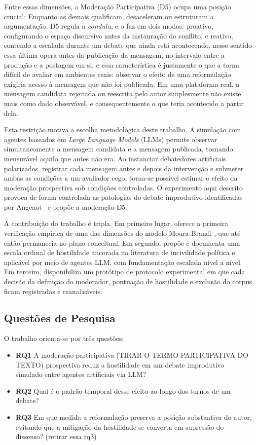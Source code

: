 \documentclass[conference]{IEEEtran} \IEEEoverridecommandlockouts %
\begin{document}
Entre essas dimensões, a Moderação Participativa (D5) ocupa uma posição crucial: Enquanto as demais qualificam, desaceleram ou estruturam a
argumentação, D5 regula a \textit{conduta}, e o faz em dois modos: proativo,
configurando o espaço discursivo antes da instauração do conflito, e reativo,
contendo a escalada durante um debate que ainda está acontecendo, nesse sentido essa última opera antes da publicação da mensagem, no intervalo entre a produção e
a postagem em si, e essa característica é justamente o que a torna difícil de
avaliar em ambientes reais: observar o efeito de uma reformulação exigiria
acesso à mensagem que não foi publicada. Em uma plataforma real, a mensagem
candidata rejeitada ou reescrita pelo autor simplesmente não existe mais como dado
observável, e consequentemente o que teria acontecido a partir dela.

Esta restrição motiva a escolha metodológica deste trabalho. A simulação com
agentes baseados em \textit{Large Language Models} (LLMs) permite observar
simultaneamente a mensagem candidata e a mensagem publicada, tornando
mensurável aquilo que antes não era. Ao instanciar
debatedores artificiais polarizados, registrar cada mensagem antes e depois da
intervenção e submeter ambas as condições a um avaliador cego, torna-se
possível estimar o efeito da moderação prospectiva sob condições controladas.
O experimento aqui descrito provoca de forma controlada as patologias do debate
improdutivo identificadas por Angenot~\cite{angenot2008dialogues} e propõe a moderação D5.

A contribuição do trabalho é tripla. Em primeiro lugar, oferece a primeira
verificação empírica de uma das dimensões do modelo Moura-Brandi \cite{moura2026hostility}, que até então
permanecia no plano conceitual. Em segundo, propõe e documenta uma escala
ordinal de hostilidade ancorada na literatura de incivilidade política e
aplicável por meio de agentes LLM, com fundamentação escalada nível a nível. Em
terceiro, disponibiliza um protótipo de protocolo experimental em
que cada decisão da definição do moderador, pontuação de hostilidade e exclusão do corpus ficam
registradas e reanalisáveis.

\subsection{Questões de Pesquisa}

O trabalho orienta-se por três questões:

\begin{itemize}
  \item \textbf{RQ1} A moderação  participativa (TIRAR O TERMO PARTICIPATIVA DO TEXTO) prospectiva reduz a
        hostilidade em um debate improdutivo simulado entre agentes artificiais via LLM?
  \item \textbf{RQ2} Qual é o padrão temporal desse efeito ao longo dos turnos de um debate?
  \item \textbf{RQ3} Em que medida a reformulação preserva a posição
        substantiva do autor, evitando que a mitigação da hostilidade se
        converta em supressão do dissenso? (retirar essa rq3)
\end{itemize}
\end{document}
